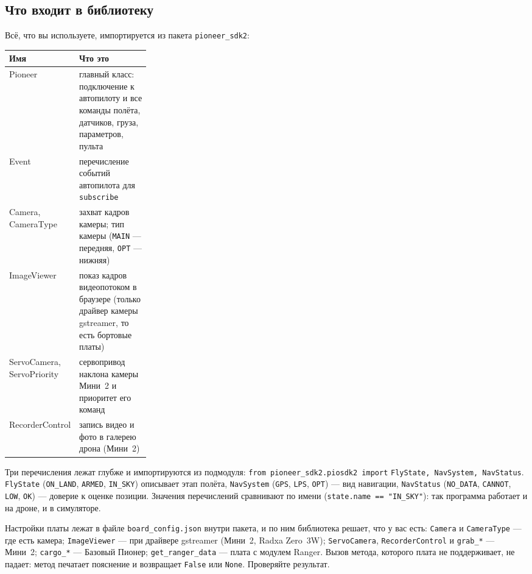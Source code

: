 \subsection{Что входит в библиотеку}

Всё, что вы используете, импортируется из пакета \verb|pioneer_sdk2|:

\begin{center}
\small
\begin{tabularx}{\linewidth}{@{}>{\ttfamily\raggedright\arraybackslash}p{0.27\linewidth} X@{}}
\toprule
\textrm{\textbf{Имя}} & \textbf{Что это} \\
\midrule
Pioneer & главный класс: подключение к автопилоту и все команды полёта, датчиков, груза, параметров, пульта \\
Event & перечисление событий автопилота для \verb|subscribe| \\
Camera, CameraType & захват кадров камеры; тип камеры (\verb|MAIN| --- передняя, \verb|OPT| --- нижняя) \\
ImageViewer & показ кадров видеопотоком в браузере (только драйвер камеры gstreamer, то есть бортовые платы) \\
ServoCamera, ServoPriority & сервопривод наклона камеры Мини~2 и приоритет его команд \\
RecorderControl & запись видео и фото в галерею дрона (Мини~2) \\
\bottomrule
\end{tabularx}
\end{center}

Три перечисления лежат глубже и импортируются из подмодуля: \verb|from pioneer_sdk2.piosdk2 import| \verb|FlyState, NavSystem, NavStatus|. \verb|FlyState| (\verb|ON_LAND|, \verb|ARMED|, \verb|IN_SKY|) описывает этап полёта, \verb|NavSystem| (\verb|GPS|, \verb|LPS|, \verb|OPT|) --- вид навигации, \verb|NavStatus| (\verb|NO_DATA|, \verb|CANNOT|, \verb|LOW|, \verb|OK|) --- доверие к оценке позиции. Значения перечислений сравнивают по имени (\verb|state.name == "IN_SKY"|): так программа работает и на дроне, и в симуляторе.

\begin{infobox}
Настройки платы лежат в файле \texttt{board\_config.json} внутри пакета, и по ним библиотека решает, что у вас есть: \verb|Camera| и \verb|CameraType| --- где есть камера; \verb|ImageViewer| --- при драйвере gstreamer (Мини~2, Radxa Zero~3W); \verb|ServoCamera|, \verb|RecorderControl| и \verb|grab_*| --- Мини~2; \verb|cargo_*| --- Базовый Пионер; \verb|get_ranger_data| --- плата с модулем Ranger. Вызов метода, которого плата не поддерживает, не падает: метод печатает пояснение и возвращает \verb|False| или \verb|None|. Проверяйте результат.
\end{infobox}

